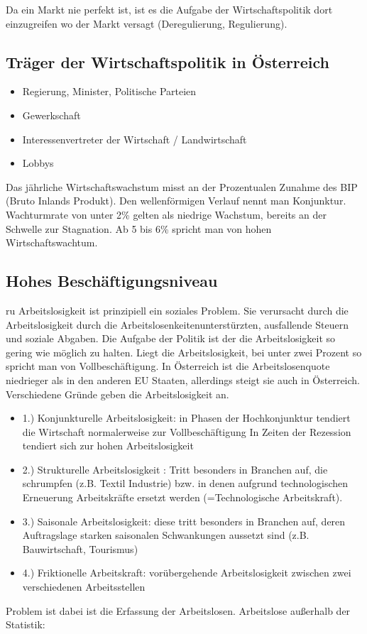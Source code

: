 \documentclass[a4paper]{report}
\begin{document}
Da ein Markt nie perfekt ist, ist es die Aufgabe der Wirtschaftspolitik dort einzugreifen wo der Markt versagt (Deregulierung, Regulierung).

\subsection*{Träger der Wirtschaftspolitik in Österreich}

\begin{itemize}
\item Regierung, Minister, Politische Parteien
\item Gewerkschaft
\item Interessenvertreter der Wirtschaft / Landwirtschaft
\item Lobbys
\end{itemize}

Das jährliche Wirtschaftswachstum misst an der Prozentualen Zunahme des BIP (Bruto Inlands Produkt). Den wellenförmigen Verlauf nennt man Konjunktur. Wachturmrate von unter 2\% gelten als niedrige Wachstum, bereits an der Schwelle zur Stagnation. Ab 5 bis 6\% spricht man von hohen Wirtschaftswachtum.

\subsection*{Hohes Beschäftigungsniveau}
ru
Arbeitslosigkeit ist prinzipiell ein soziales Problem. Sie verursacht durch die Arbeitslosigkeit durch die Arbeitslosenkeitenunterstürzten, ausfallende Steuern und soziale Abgaben. Die Aufgabe der Politik ist der die Arbeitslosigkeit so gering wie möglich zu halten.
Liegt die Arbeitslosigkeit, bei unter zwei Prozent so spricht man von Vollbeschäftigung. In Österreich ist die Arbeitslosenquote niedrieger als in den anderen EU Staaten, allerdings steigt sie auch in Österreich. Verschiedene Gründe geben die Arbeitslosigkeit an.

\begin{itemize}
\item 1.) Konjunkturelle Arbeitslosigkeit: in Phasen der Hochkonjunktur tendiert die Wirtschaft normalerweise zur Vollbeschäftigung
In Zeiten der Rezession tendiert sich zur hohen Arbeitslosigkeit
\item 2.) Strukturelle Arbeitslosigkeit : Tritt besonders in Branchen auf, die schrumpfen (z.B. Textil Industrie) bzw. in denen aufgrund technologischen Erneuerung Arbeitskräfte ersetzt werden (=Technologische Arbeitskraft).
\item 3.) Saisonale Arbeitslosigkeit:  diese tritt besonders in Branchen auf, deren Auftragslage starken saisonalen Schwankungen aussetzt sind (z.B. Bauwirtschaft, Tourismus)
\item 4.) Friktionelle Arbeitskraft: vorübergehende Arbeitslosigkeit zwischen zwei verschiedenen Arbeitsstellen
\end{itemize}
Problem ist dabei ist die Erfassung der Arbeitslosen. Arbeitslose außerhalb der Statistik:
\end{document}
